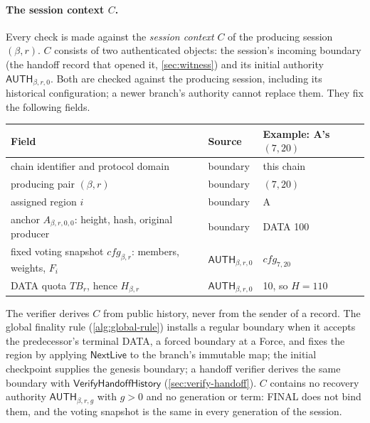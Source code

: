 \documentclass[11pt,a4paper]{article}
\newcommand{\TB}{\mathit{TB}}
\newcommand{\tagg}[1]{\ensuremath{\mathsf{#1}}}
\newcommand{\defterm}[1]{\textcolor{rrBlue}{\textit{#1}}}
\newcounter{protocol}
\begin{document}
\paragraph{The session context $C$.}
Every check is made against the \defterm{session context} $C$ of the
producing session $(\beta,r)$. $C$ consists of two authenticated
objects: the session's incoming boundary (the handoff record that opened
it, \cref{sec:witness}) and its initial authority $\tagg{AUTH}_{\beta,r,0}$.
Both are checked against the producing session, including its historical
configuration; a newer branch's authority cannot replace them.
They fix the following fields.
\begin{center}\small
\begin{tabularx}{\linewidth}{@{}>{\raggedright\arraybackslash}p{.36\linewidth}>{\raggedright\arraybackslash}p{.2\linewidth}Y@{}}\toprule
Field & Source & Example: A's $(7,20)$\\\midrule
chain identifier and protocol domain & boundary & this chain\\
producing pair $(\beta,r)$ & boundary & $(7,20)$\\
assigned region $i$ & boundary & A\\
anchor $A_{\beta,r,0,0}$: height, hash, original producer & boundary & DATA 100\\
fixed voting snapshot $\mathit{cfg}_{\beta,r}$: members, weights, $F_i$ & $\tagg{AUTH}_{\beta,r,0}$ & $\mathit{cfg}_{7,20}$\\
DATA quota $\TB_r$, hence $H_{\beta,r}$ & $\tagg{AUTH}_{\beta,r,0}$ & 10, so $H=110$\\\bottomrule
\end{tabularx}
\end{center}
The verifier derives $C$ from public history, never from the sender of a
record. The global finality rule (\cref{alg:global-rule}) installs a
regular boundary when it accepts the predecessor's terminal DATA, a
forced boundary at a Force, and fixes the region by applying
$\tagg{NextLive}$ to the branch's immutable map; the
initial checkpoint supplies the genesis boundary; a handoff verifier
derives the same boundary with $\tagg{VerifyHandoffHistory}$
(\cref{sec:verify-handoff}). $C$ contains no recovery authority
$\tagg{AUTH}_{\beta,r,g}$ with $g>0$ and no generation or term: FINAL does not
bind them, and the voting snapshot is the same in every generation of
the session.
\end{document}
